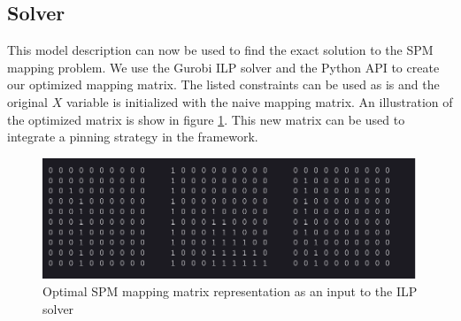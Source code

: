 \subsection{Solver}
This model description can now be used to find the exact solution to the SPM
mapping problem. We use the Gurobi ILP solver and the Python API to create our
optimized mapping matrix. The listed constraints can be used as is and the
original $X$ variable is initialized with the naive mapping matrix.  An
illustration of the optimized matrix is show in figure \ref{fig:optimalSPM2D}.
This new matrix can be used to integrate a pinning strategy in the framework.

\begin{figure}[thb!]
\centering
\includegraphics[scale=0.55]{Figures/optimal_matrix_mapping.png}
\decoRule
\caption[optimal2d]{Optimal SPM mapping matrix representation as an input to the ILP solver}
\label{fig:optimalSPM2D}
\end{figure}


